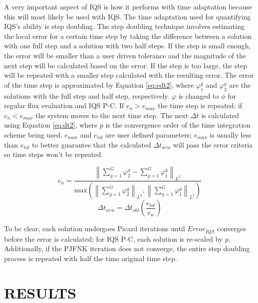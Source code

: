 \documentclass[12pt]{scrartcl}
\newcommand{\norm}[1]{\left\lVert#1\right\rVert_{L^2}}
\newcommand{\be}{\begin{equation}}
\newcommand{\ee}{\end{equation}}
\begin{document}
A very important aspect of IQS is how it performs with time adaptation because this will most likely be used with IQS.  The time adaptation used for quantifying IQS's ability is step doubling.  The step doubling technique involves estimating the local error for a certain time step by taking the difference between a solution with one full step and a solution with two half steps.  If the step is small enough, the error will be smaller than a user driven tolerance and the magnitude of the next step will be calculated based on the error.  If the step is too large, the step will be repeated with a smaller step calculated with the resulting error.  The error of the time step is approximated by Equation \ref{eq:edt2}, where $\varphi^g_1$ and $\varphi^g_2$ are the solutions with the full step and half step, respectively.  $\varphi$ is changed to $\phi$ for regular flux evaluation and IQS P-C.  If $e_n > e_{max}$ the time step is repeated; if $e_n < e_{max}$ the system moves to the next time step.  The next $\Delta t$ is calculated using Equation \ref{eq:dt2}, where $p$ is the convergence order of the time integration scheme being used.  $e_{max}$ and $e_{tol}$ are user defined parameters; $e_{max}$ is usually less than $e_{tol}$ to better guarantee that the calculated $\Delta t_{new}$ will pass the error criteria so time steps won't be repeated.

\be
e_n = \frac{\norm{\sum_{g=1}^G\varphi^g_2 - \sum_{g=1}^G\varphi^g_1}}{\text{max}\left(\norm{\sum_{g=1}^G\varphi^g_2},\norm{\sum_{g=1}^G\varphi^g_1}\right)}
\label{eq:edt2}
\ee
\be
\Delta t_{new} = \Delta t_{old} \left(\frac{e_{tol}}{e_n}\right)
\label{eq:dt2}
\ee

To be clear, each solution undergoes Picard iterations until $Error_{IQS}$ converges before the error is calculated; for IQS P-C, each solution is re-scaled by $p$.  Additionally, if the PJFNK iteration does not converge, the entire step doubling process is repeated with half the time original time step. 

\newpage
%
\section{RESULTS} 
\label{sect::results}
\end{document}
